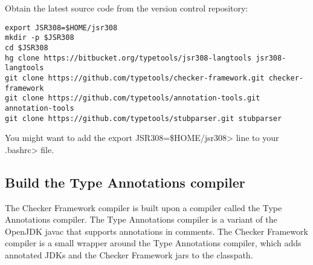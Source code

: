 Obtain the latest source code from the version control repository:

\begin{Verbatim}
export JSR308=$HOME/jsr308
mkdir -p $JSR308
cd $JSR308
hg clone https://bitbucket.org/typetools/jsr308-langtools jsr308-langtools
git clone https://github.com/typetools/checker-framework.git checker-framework
git clone https://github.com/typetools/annotation-tools.git annotation-tools
git clone https://github.com/typetools/stubparser.git stubparser
\end{Verbatim}

You might want to add the \<export JSR308=\$HOME/jsr308> line to your
\<.bashrc> file.


\subsection{Build the Type Annotations compiler\label{building-compiler}}

The Checker Framework compiler is built upon a compiler called the Type
Annotations compiler.  The Type Annotations compiler is a variant of the
OpenJDK javac that supports annotations in comments.  The Checker Framework
compiler is a small wrapper around the Type Annotations compiler, which
adds annotated JDKs and the Checker Framework jars to the classpath.


